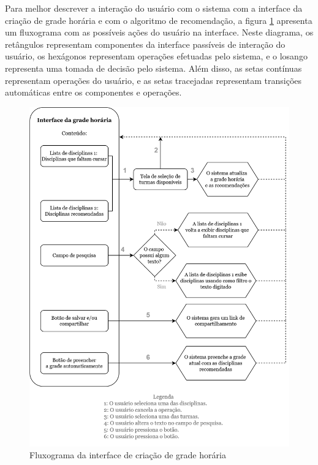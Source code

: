 Para melhor descrever a interação do usuário com o sistema com a interface da criação de grade horária e com o algoritmo de recomendação, a figura \ref{fig:fluxograma-grade} apresenta um fluxograma com as possíveis ações do usuário na interface. Neste diagrama, os retângulos representam componentes da interface passíveis de interação do usuário, os hexágonos representam operações efetuadas pelo sistema, e o losango representa uma tomada de decisão pelo sistema. Além disso, as setas contínuas representam operações do usuário, e as setas tracejadas representam transições automáticas entre os componentes e operações. 

\begin{figure}[ht]
    \begin{center}
    \includegraphics[width=390pt]{figuras/fluxograma-grade.drawio.png}
    \caption{Fluxograma da interface de criação de grade horária}
    \label{fig:fluxograma-grade}
    \end{center}
\end{figure}
